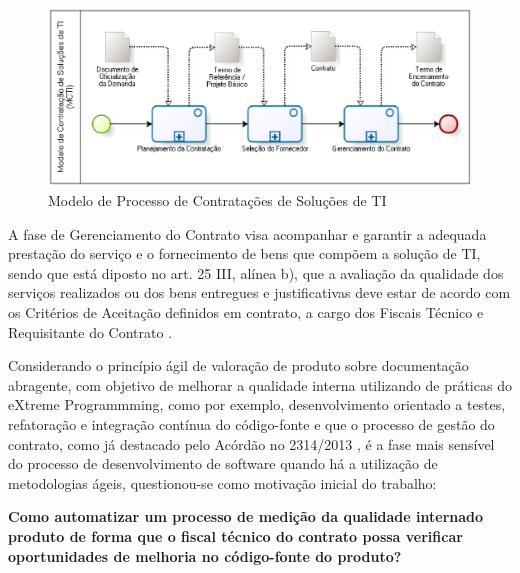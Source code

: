 \begin{figure}[h]
        \centering
        \label{processo}
            \includegraphics[scale=0.7]{figuras/MCTI.eps}
        \caption{Modelo de Processo de Contratações de Soluções de TI \cite{mcti}}
\end{figure}

A fase de Gerenciamento do Contrato visa acompanhar e garantir a adequada prestação do serviço e o fornecimento de bens que compõem a solução de TI, sendo que está diposto no art. 25 III, alínea b), que a avaliação da qualidade dos serviços realizados ou dos bens entregues e justificativas deve estar de acordo com os Critérios de Aceitação definidos em contrato, a cargo dos Fiscais Técnico e Requisitante do Contrato \cite{IN04:2010}.


Considerando o princípio ágil de valoração de produto sobre documentação abragente, com objetivo de melhorar a qualidade interna utilizando de práticas do eXtreme Programmming, como por exemplo, desenvolvimento orientado a testes, refatoração e integração contínua do código-fonte \cite{beck1999} e que o processo de gestão do contrato, como já destacado pelo Acórdão no 2314/2013 \cite{TCU:2013}, é a fase mais sensível do processo de desenvolvimento de software quando há a utilização de metodologias ágeis, questionou-se como motivação inicial do trabalho:

\textbf{Como automatizar um processo de medição da qualidade internado produto de forma que o fiscal técnico do contrato possa verificar oportunidades de melhoria no código-fonte do produto?}